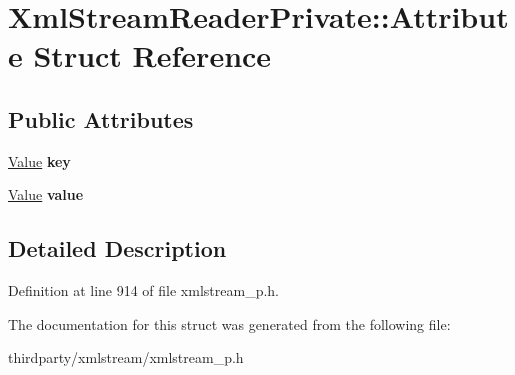 \hypertarget{struct_xml_stream_reader_private_1_1_attribute}{}\section{Xml\+Stream\+Reader\+Private\+:\+:Attribute Struct Reference}
\label{struct_xml_stream_reader_private_1_1_attribute}
\subsection*{Public Attributes}
\begin{DoxyCompactItemize}
\item 
\mbox{\label{struct_xml_stream_reader_private_1_1_attribute_a8e0c65acfb63218d45676b5ed43c5d83}} 
\hyperlink{struct_xml_stream_reader_private_1_1_value}{Value} {\bfseries key}
\item 
\mbox{\label{struct_xml_stream_reader_private_1_1_attribute_a5721d3d11d22c439e0ddde6299ffee26}} 
\hyperlink{struct_xml_stream_reader_private_1_1_value}{Value} {\bfseries value}
\end{DoxyCompactItemize}


\subsection{Detailed Description}


Definition at line 914 of file xmlstream\+\_\+p.\+h.



The documentation for this struct was generated from the following file\+:\begin{DoxyCompactItemize}
\item 
thirdparty/xmlstream/xmlstream\+\_\+p.\+h\end{DoxyCompactItemize}
